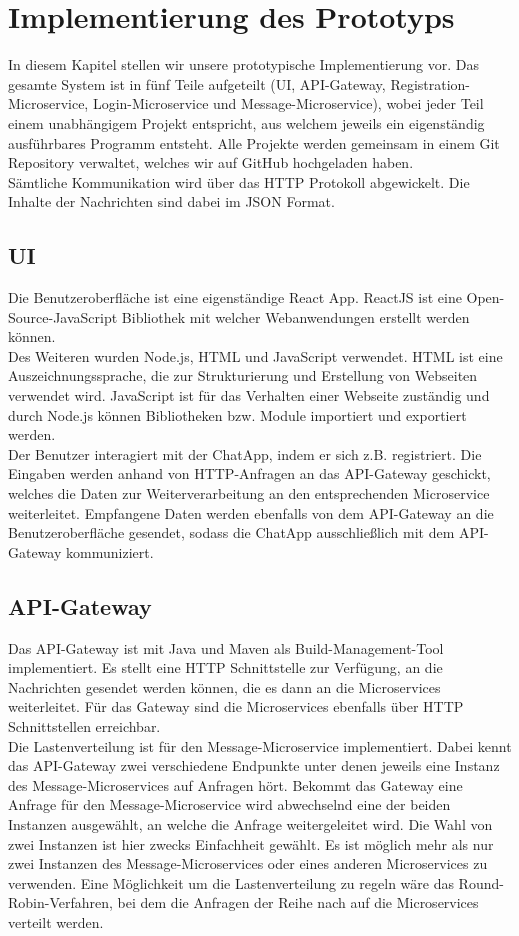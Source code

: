 \section{Implementierung des Prototyps}
In diesem Kapitel stellen wir unsere prototypische Implementierung vor. Das gesamte System ist in fünf Teile aufgeteilt (UI, API-Gateway, Registration-Microservice, Login-Microservice und Message-Microservice), wobei jeder Teil einem unabhängigem Projekt entspricht, aus welchem jeweils ein eigenständig ausführbares Programm entsteht. Alle Projekte werden gemeinsam in einem Git Repository verwaltet, welches wir auf GitHub hochgeladen haben.\\
Sämtliche Kommunikation wird über das \ac{HTTP} Protokoll abgewickelt. Die Inhalte der Nachrichten sind dabei im \ac{JSON} Format.

\subsection{UI}
Die Benutzeroberfläche ist eine eigenständige React App. ReactJS ist eine Open-Source-JavaScript Bibliothek mit welcher Webanwendungen erstellt werden können.\\
Des Weiteren wurden Node.js, \ac{HTML} und JavaScript verwendet. HTML ist eine Auszeichnungssprache, die zur Strukturierung und Erstellung von Webseiten verwendet wird. JavaScript ist für das Verhalten einer Webseite zuständig und durch Node.js können Bibliotheken bzw. Module importiert und exportiert werden.\\
Der Benutzer interagiert mit der ChatApp, indem er sich z.B. registriert. Die Eingaben werden anhand von HTTP-Anfragen an das API-Gateway geschickt, welches die Daten zur Weiterverarbeitung an den entsprechenden Microservice weiterleitet. Empfangene Daten werden ebenfalls von dem API-Gateway an die Benutzeroberfläche gesendet, sodass die ChatApp ausschließlich mit dem API-Gateway kommuniziert.

\subsection{API-Gateway}
Das API-Gateway ist mit Java und Maven als Build-Management-Tool implementiert. Es stellt eine HTTP Schnittstelle zur Verfügung, an die Nachrichten gesendet werden können, die es dann an die Microservices weiterleitet. Für das Gateway sind die Microservices ebenfalls über HTTP Schnittstellen erreichbar.\\
Die Lastenverteilung ist für den Message-Microservice implementiert. Dabei kennt das API-Gateway zwei verschiedene Endpunkte unter denen jeweils eine Instanz des Message-Microservices auf Anfragen hört. Bekommt das Gateway eine Anfrage für den Message-Microservice wird abwechselnd eine der beiden Instanzen ausgewählt, an welche die Anfrage weitergeleitet wird. Die Wahl von zwei Instanzen ist hier zwecks Einfachheit gewählt. Es ist möglich mehr als nur zwei Instanzen des Message-Microservices oder eines anderen Microservices zu verwenden. Eine Möglichkeit um die Lastenverteilung zu regeln wäre das Round-Robin-Verfahren, bei dem die Anfragen der Reihe nach auf die Microservices verteilt werden.

